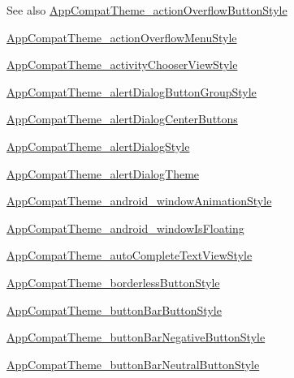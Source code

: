 \begin{DoxySeeAlso}{See also}
\hyperlink{classandroid_1_1support_1_1design_1_1R_1_1styleable_a1a82f2c29c2dd5fb202086c562a387a4}{App\+Compat\+Theme\+\_\+action\+Overflow\+Button\+Style} 

\hyperlink{classandroid_1_1support_1_1design_1_1R_1_1styleable_a9665b225f5841e21d3041cc0b4bc2c20}{App\+Compat\+Theme\+\_\+action\+Overflow\+Menu\+Style} 

\hyperlink{classandroid_1_1support_1_1design_1_1R_1_1styleable_acf223883bba2bd20dfcd85b3817e5c51}{App\+Compat\+Theme\+\_\+activity\+Chooser\+View\+Style} 

\hyperlink{classandroid_1_1support_1_1design_1_1R_1_1styleable_a677c1a9a3b75fec8ef5728a4e4d62af1}{App\+Compat\+Theme\+\_\+alert\+Dialog\+Button\+Group\+Style} 

\hyperlink{classandroid_1_1support_1_1design_1_1R_1_1styleable_a80b2dc95b64789c884807b4dcd06b6d0}{App\+Compat\+Theme\+\_\+alert\+Dialog\+Center\+Buttons} 

\hyperlink{classandroid_1_1support_1_1design_1_1R_1_1styleable_ac70cd07091cc32fa36cbc2c66306ee94}{App\+Compat\+Theme\+\_\+alert\+Dialog\+Style} 

\hyperlink{classandroid_1_1support_1_1design_1_1R_1_1styleable_ab193347a11cc3f92c5815a51c851a4a6}{App\+Compat\+Theme\+\_\+alert\+Dialog\+Theme} 

\hyperlink{classandroid_1_1support_1_1design_1_1R_1_1styleable_a6b9a59df5797c2d5c2db14b13076bccd}{App\+Compat\+Theme\+\_\+android\+\_\+window\+Animation\+Style} 

\hyperlink{classandroid_1_1support_1_1design_1_1R_1_1styleable_addf459f4095c33a1a44b0cdeea8a72d9}{App\+Compat\+Theme\+\_\+android\+\_\+window\+Is\+Floating} 

\hyperlink{classandroid_1_1support_1_1design_1_1R_1_1styleable_ac4ebe90582d8572ba360303f2afe7100}{App\+Compat\+Theme\+\_\+auto\+Complete\+Text\+View\+Style} 

\hyperlink{classandroid_1_1support_1_1design_1_1R_1_1styleable_a51f25c97407bb9f72b8b17f1681d354c}{App\+Compat\+Theme\+\_\+borderless\+Button\+Style} 

\hyperlink{classandroid_1_1support_1_1design_1_1R_1_1styleable_af8735dbd6db5ad3231c6574488067693}{App\+Compat\+Theme\+\_\+button\+Bar\+Button\+Style} 

\hyperlink{classandroid_1_1support_1_1design_1_1R_1_1styleable_aeede02e7ba2a6ab7672998a15ad32367}{App\+Compat\+Theme\+\_\+button\+Bar\+Negative\+Button\+Style} 

\hyperlink{classandroid_1_1support_1_1design_1_1R_1_1styleable_a4599da08b2e1afe7ea7a57322f4c6e3a}{App\+Compat\+Theme\+\_\+button\+Bar\+Neutral\+Button\+Style} 


\end{DoxySeeAlso}
